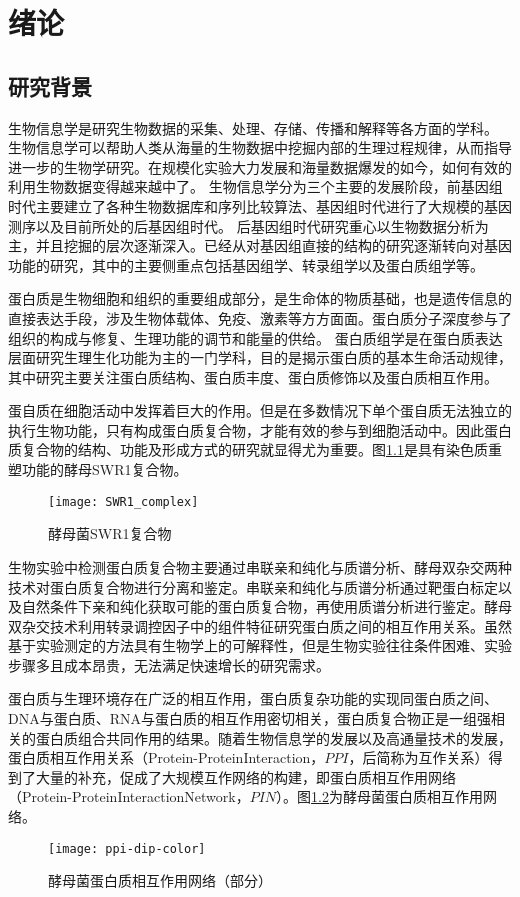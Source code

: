 \chapter{绪论}
\label{chapter:intro}


\section{研究背景}
\label{section:intro:background}

生物信息学是研究生物数据的采集、处理、存储、传播和解释等各方面的学科。
生物信息学可以帮助人类从海量的生物数据中挖掘内部的生理过程规律，从而指导进一步的生物学研究。在规模化实验大力发展和海量数据爆发的如今，如何有效的利用生物数据变得越来越中了。
生物信息学分为三个主要的发展阶段，前基因组时代主要建立了各种生物数据库和序列比较算法、基因组时代进行了大规模的基因测序以及目前所处的后基因组时代。
后基因组时代研究重心以生物数据分析为主，并且挖掘的层次逐渐深入。已经从对基因组直接的结构的研究逐渐转向对基因功能的研究，其中的主要侧重点包括基因组学、转录组学以及蛋白质组学等\cite{helms_principles_2019}。

蛋白质是生物细胞和组织的重要组成部分，是生命体的物质基础，也是遗传信息的直接表达手段，涉及生物体载体、免疫、激素等方方面面。蛋白质分子深度参与了组织的构成与修复、生理功能的调节和能量的供给。
蛋白质组学\cite{schubert_quantitative_2017}是在蛋白质表达层面研究生理生化功能为主的一门学科，目的是揭示蛋白质的基本生命活动规律，其中研究主要关注蛋白质结构、蛋白质丰度、蛋白质修饰以及蛋白质相互作用。

蛋自质在细胞活动中发挥着巨大的作用。但是在多数情况下单个蛋自质无法独立的执行生物功能，只有构成蛋白质复合物，才能有效的参与到细胞活动中\cite{gavin_functional_2002}。因此蛋白质复合物的结构、功能及形成方式的研究就显得尤为重要。图\ref{fig:swr1_complex}是具有染色质重塑功能的酵母SWR1复合物。
\begin{figure}[htbp]
  \centering
  \texttt{[image: SWR1\_complex]}
  \caption{酵母菌SWR1复合物\cite{willhoft_structure_2018}}
  \label{fig:swr1_complex}
\end{figure}
生物实验中检测蛋白质复合物主要通过串联亲和纯化与质谱分析\cite{g_generic_1999}、酵母双杂交\cite{li_identification_1993}两种技术对蛋白质复合物进行分离和鉴定。串联亲和纯化与质谱分析通过靶蛋白标定以及自然条件下亲和纯化获取可能的蛋白质复合物，再使用质谱分析进行鉴定。酵母双杂交技术利用转录调控因子中的组件特征研究蛋白质之间的相互作用关系。虽然基于实验测定的方法具有生物学上的可解释性，但是生物实验往往条件困难、实验步骤多且成本昂贵，无法满足快速增长的研究需求。

蛋白质与生理环境存在广泛的相互作用，蛋白质复杂功能的实现同蛋白质之间、DNA与蛋白质、RNA与蛋白质的相互作用密切相关，蛋白质复合物正是一组强相关的蛋白质组合共同作用的结果。随着生物信息学的发展以及高通量技术的发展，蛋白质相互作用关系（Protein-ProteinInteraction，$PPI$，后简称为互作关系）得到了大量的补充，促成了大规模互作网络的构建\cite{butland_interaction_2005}，即蛋白质相互作用网络（Protein-ProteinInteractionNetwork，$PIN$）。图\ref{fig:ppi}为酵母菌蛋白质相互作用网络。
\begin{figure}[htbp]
  \centering
  \texttt{[image: ppi-dip-color]}
  \caption{酵母菌蛋白质相互作用网络（部分）}
  \label{fig:ppi}
\end{figure}

